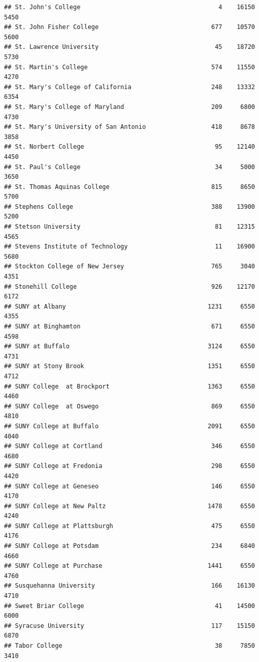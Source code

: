 \documentclass[
]{article}
\begin{document}
\begin{verbatim}
## St. John's College                                      4    16150       5450
## St. John Fisher College                               677    10570       5600
## St. Lawrence University                                45    18720       5730
## St. Martin's College                                  574    11550       4270
## St. Mary's College of California                      248    13332       6354
## St. Mary's College of Maryland                        209     6800       4730
## St. Mary's University of San Antonio                  418     8678       3858
## St. Norbert College                                    95    12140       4450
## St. Paul's College                                     34     5000       3650
## St. Thomas Aquinas College                            815     8650       5700
## Stephens College                                      388    13900       5200
## Stetson University                                     81    12315       4565
## Stevens Institute of Technology                        11    16900       5680
## Stockton College of New Jersey                        765     3040       4351
## Stonehill College                                     926    12170       6172
## SUNY at Albany                                       1231     6550       4355
## SUNY at Binghamton                                    671     6550       4598
## SUNY at Buffalo                                      3124     6550       4731
## SUNY at Stony Brook                                  1351     6550       4712
## SUNY College  at Brockport                           1363     6550       4460
## SUNY College  at Oswego                               869     6550       4810
## SUNY College at Buffalo                              2091     6550       4040
## SUNY College at Cortland                              346     6550       4680
## SUNY College at Fredonia                              298     6550       4420
## SUNY College at Geneseo                               146     6550       4170
## SUNY College at New Paltz                            1478     6550       4240
## SUNY College at Plattsburgh                           475     6550       4176
## SUNY College at Potsdam                               234     6840       4660
## SUNY College at Purchase                             1441     6550       4760
## Susquehanna University                                166    16130       4710
## Sweet Briar College                                    41    14500       6000
## Syracuse University                                   117    15150       6870
## Tabor College                                          38     7850       3410

\end{verbatim}
\end{document}
